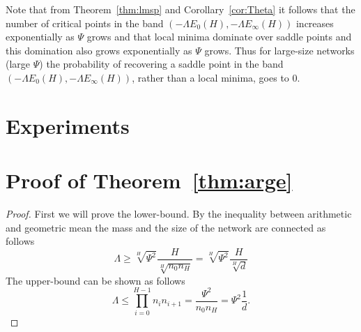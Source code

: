 \documentclass[twoside]{article}
\begin{document}
Note that from Theorem~\ref{thm:lmsp} and Corollary~\ref{cor:Theta} it follows that the number of critical points in the band $\left(-\Lambda E_0(H),-\Lambda E_{\infty}(H)\right)$ increases exponentially as $\Psi$ grows and that local minima dominate over saddle points and this domination also grows exponentially as $\Psi$ grows. Thus for large-size networks (large $\Psi$) the probability of recovering a saddle point in the band $\left(-\Lambda E_0(H),-\Lambda E_{\infty}(H)\right)$, rather than a local minima, goes to $0$.

\section{Experiments}
\label{sec:Experiments}




\newpage

\toptitlebar 
{\Large \bf  {} \par}
\bottomtitlebar

\section{Proof of Theorem~\ref{thm:arge}}
\begin{proof}
First we will prove the lower-bound. By the inequality between arithmetic and geometric mean the mass and the size of the network are connected as follows
\[\Lambda \geq \sqrt[H]{\Psi^2}\frac{H}{\sqrt[H]{n_0n_H}} = \sqrt[H]{\Psi^2}\frac{H}{\sqrt[H]{d}}
\]
The upper-bound can be shown as follows
\[\Lambda \leq \prod_{i=0}^{H-1}n_in_{i+1} = \frac{\Psi^2}{n_0n_H} = \Psi^2\frac{1}{d}.
\]
\end{proof}
\end{document}
